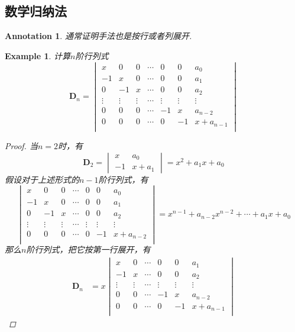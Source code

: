 \documentclass{article}
\newtheorem{example}[theorem]{Example}
\newtheorem{annotation}[theorem]{Annotation}
\newcommand{\mbf}[1]{\bm{#1}}
\begin{document}
\subsection{数学归纳法}

\begin{annotation}
\rm 通常证明手法也是按行或者列展开.
\end{annotation}

\begin{example}
\rm 计算$n$阶行列式
$$
\mbf{D}_n = \begin{vmatrix}
x & 0 & 0  & \cdots & 0 & 0 & a_0 \\
-1 & x & 0  & \cdots & 0 & 0 & a_1 \\
0 & -1 & x  & \cdots & 0 & 0 & a_2 \\
\vdots & \vdots & \vdots  & \cdots & \vdots & \vdots & \vdots \\
0 & 0 & 0  & \cdots & -1 & x & a_{n-2} \\
0 & 0 & 0  & \cdots & 0 & -1 & x+a_{n-1} \\
\end{vmatrix}
$$
\begin{proof}
当$n=2$时，有
$$
\mbf{D}_2 = \begin{vmatrix}
x & a_0 \\
-1 & x+a_1 
\end{vmatrix} = x^2 + a_1x+ a_0
$$
假设对于上述形式的$n-1$阶行列式，有
$$
\begin{vmatrix}
x & 0 & 0  & \cdots & 0 & 0 & a_0 \\
-1 & x & 0  & \cdots & 0 & 0 & a_1 \\
0 & -1 & x  & \cdots & 0 & 0 & a_2 \\
\vdots & \vdots & \vdots  & \cdots & \vdots & \vdots & \vdots \\
0 & 0 & 0  & \cdots & 0 & -1 & x+a_{n-2} \\
\end{vmatrix} = x^{n-1} + a_{n-2}x^{n-2} + \cdots + a_1x + a_0
$$
那么$n$阶行列式，把它按第一行展开，有
$$
\begin{array}{ll}
\mbf{D}_n &= x\begin{vmatrix}
 x & 0  & \cdots & 0 & 0 & a_1 \\
 -1 & x  & \cdots & 0 & 0 & a_2 \\
 \vdots & \vdots  & \cdots & \vdots & \vdots & \vdots \\
 0 & 0  & \cdots & -1 & x & a_{n-2} \\
 0 & 0  & \cdots & 0 & -1 & x+a_{n-1} \\

\end{vmatrix}
\end{array}$$
\end{proof}
\end{example}
\end{document}
